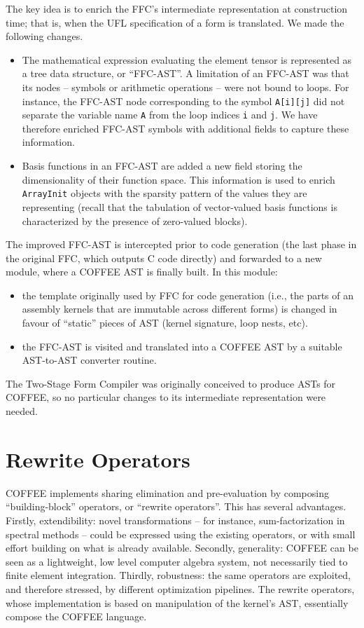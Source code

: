 The key idea is to enrich the FFC's intermediate representation at construction time; that is, when the UFL specification of a form is translated. We made the following changes.
\begin{itemize}
\item The mathematical expression evaluating the element tensor is represented as a tree data structure, or ``FFC-AST''. A limitation of an FFC-AST was that its nodes -- symbols or arithmetic operations -- were not bound to loops. For instance, the FFC-AST node corresponding to the symbol \texttt{A[i][j]} did not separate the variable name \texttt{A} from the loop indices \texttt{i} and \texttt{j}. We have therefore enriched FFC-AST symbols with additional fields to capture these information.
\item Basis functions in an FFC-AST are added a new field storing the dimensionality of their function space. This information is used to enrich \texttt{ArrayInit} objects with the sparsity pattern of the values they are representing (recall that the tabulation of vector-valued basis functions is characterized by the presence of zero-valued blocks).
\end{itemize}

The improved FFC-AST is intercepted prior to code generation (the last phase in the original FFC, which outputs C code directly) and forwarded to a new module, where a COFFEE AST is finally built. In this module:
\begin{itemize}
\item the template originally used by FFC for code generation (i.e., the parts of an assembly kernels that are immutable across different forms) is changed in favour of ``static'' pieces of AST (kernel signature, loop nests, etc).
\item the FFC-AST is visited and translated into a COFFEE AST by a suitable AST-to-AST converter routine.
\end{itemize}

The Two-Stage Form Compiler was originally conceived to produce ASTs for COFFEE, so no particular changes to its intermediate representation were needed. 


\section{Rewrite Operators}
\label{sec:coffee:rewrite-ops}
COFFEE implements sharing elimination and pre-evaluation by composing ``building-block'' operators, or ``rewrite operators''. This has several advantages. Firstly, extendibility: novel transformations -- for instance, sum-factorization in spectral methods -- could be expressed using the existing operators, or with small effort building on what is already available. Secondly, generality: COFFEE can be seen as a lightweight, low level computer algebra system, not necessarily tied to finite element integration. Thirdly, robustness: the same operators are exploited, and therefore stressed, by different optimization pipelines. The rewrite operators, whose implementation is based on manipulation of the kernel's AST, essentially compose the COFFEE language. 

